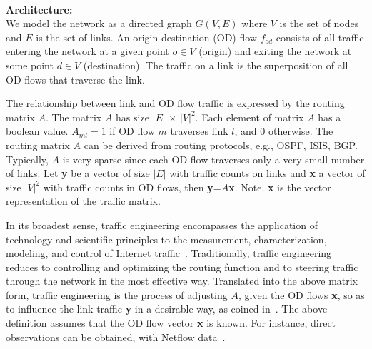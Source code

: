 \ \\\noindent\textbf{Architecture:}\label{sec:Network-Model-Architecture}\\\noindent
We model the network as a directed graph $G(V,E)$ where $V$ is the set of nodes
and $E$ is the set of links. An origin-destination (OD) flow $f_{od}$ consists
of all traffic entering the network at a given point $o \in V$ (origin) and
exiting the network at some point $d \in V$ (destination).  The traffic on a
link is the superposition of all OD flows that traverse the link.

The relationship between link and OD flow traffic is expressed by the routing
matrix $A$. The matrix $A$ has size $|E|$ $\times$ $|V|^2$. Each element of
matrix $A$ has a boolean value.  $A_{ml}=1$ if OD flow $m$ traverses link $l$,
and $0$ otherwise. The routing matrix $A$ can be derived from routing
protocols, e.g., OSPF, ISIS, BGP. Typically, $A$ is very sparse since each OD
flow traverses only a very small number of links. Let {\bf y} be a vector of
size $|E|$ with traffic counts on links and {\bf x} a vector of size $|V|^2$
with traffic counts in OD flows, then {\bf y}=$A${\bf x}. Note, {\bf x} is the
vector representation of the traffic matrix.


\smallskip
{}\label{sec:TE-Definitions}
In its broadest sense, traffic engineering encompasses the application of
technology and scientific principles to the measurement, characterization,
modeling, and control of Internet traffic~\cite{Awduche_OverviewTE:2002}.
Traditionally, traffic engineering reduces to controlling and optimizing the
routing function and to steering traffic through the network in the most
effective way.  Translated into the above matrix form, traffic engineering is
the process of adjusting $A$, given the OD flows {\bf x}, so as to influence
the link traffic {\bf y} in a desirable way, as coined
in~\cite{LakhinaSigmetrics2004}. The above definition assumes that the OD flow
vector {\bf x} is known. For instance, direct observations can be obtained, \eg
with Netflow data~\cite{Cisco_Netflow:99,TrafficDemand:ToN2001}.


